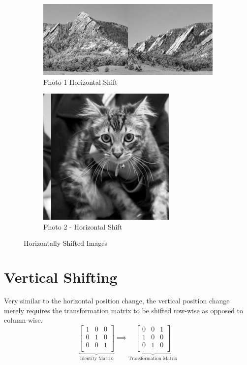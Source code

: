 \documentclass[10pt]{report}
\begin{document}
    \begin{figure}[ht]
        \centering
        \begin{subfigure}{\textwidth}
            \centering
            \includegraphics[scale=0.7]{./img/hsg1.png}
            \caption{Photo 1 Horizontal Shift}
            \label{fig:p1hg}
        \end{subfigure}
        \begin{subfigure}{\textwidth}
            \centering
            \includegraphics[scale=0.7]{./img/hsg2.png}
            \caption{Photo 2 - Horizontal Shift}
            \label{fig:p2hg}
        \end{subfigure}
        \caption{Horizontally Shifted Images}
        \label{fig:hs_images}
    \end{figure}

\section{Vertical Shifting}

Very similar to the horizontal position change, the vertical position change
merely requires the transformation matrix to be shifted row-wise as opposed to
column-wise.
\[
  \underbrace{
  \begin{bmatrix}
  1&0&0\\
  0&1&0\\
  0&0&1\\
  \end{bmatrix}
}_{\text{Identity Matrix}}
  \implies
  \underbrace{
  \begin{bmatrix}
  0&0&1\\
  1&0&0\\
  0&1&0\\
  \end{bmatrix}
}_{\text{Transformation Matrix}}
\]
\end{document}
